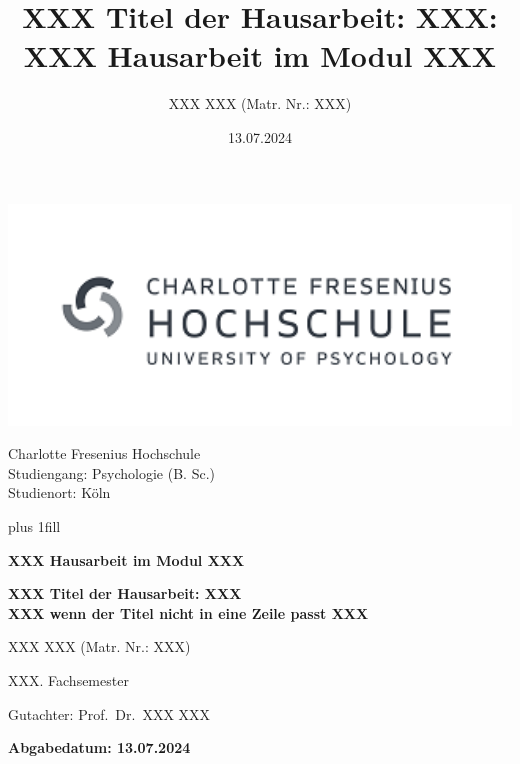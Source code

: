 \documentclass[
  stu,
  floatsintext,
  longtable,
  a4paper,
  nolmodern,
  notxfonts,
  notimes,
  donotrepeattitle,
  colorlinks=true,linkcolor=blue,citecolor=blue,urlcolor=blue]{apa7}
\title{XXX Titel der Hausarbeit: XXX: XXX Hausarbeit im Modul XXX}
\author{XXX XXX (Matr. Nr.: XXX)}
\affiliation{
{Köln, NRW }}
\date{13.07.2024}
\begin{document}
    \cleardoublepage
\thispagestyle{empty}
\hfill \includegraphics[width=20cm]{logo.png}\\
{\centering
  {\large Charlotte Fresenius Hochschule\\
Studiengang: Psychologie (B. Sc.)\\
 Studienort: Köln  \par
}
  \hbox{}\vskip 0cm plus 1fill
  {\Large \bfseries XXX Hausarbeit im Modul XXX \par}
      \vspace{3ex}
  {\Large \bfseries XXX Titel der Hausarbeit: XXX \\ XXX wenn der Titel
nicht in eine Zeile passt XXX \par}
      \vfill
      {\large XXX XXX (Matr. Nr.: XXX) \par}
      \vspace{0ex}
  {XXX. Fachsemester \par}
  \vspace{0ex}
    {\large  \par}
  \vspace{0ex}
  { \par}
    \vspace{0ex}
    {\large  \par}
  \vspace{0ex}
  { \par}
  \vspace{12ex}
  {\large Gutachter: Prof.~Dr.~XXX XXX \par}
  \vfill
  {\bfseries\large Abgabedatum: 13.07.2024 \par}
  \vspace{2ex}
  \clearpage
}



\end{document}
